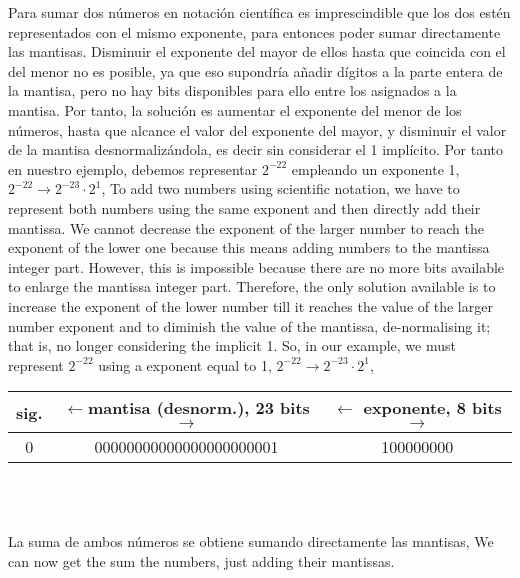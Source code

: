 \begin{paracol}{2}
Para sumar dos números en notación cientí\-fica es imprescindible que los dos estén representados con el mismo exponente, para entonces poder sumar directamente las mantisas. Disminuir el exponente del mayor de ellos hasta que coincida con el del menor no es posible, ya que eso supondría añadir dígitos a la parte entera de la mantisa, pero no hay bits disponibles para ello entre los asignados a la mantisa. Por tanto, la solución es aumentar el exponente del menor de los números, hasta que alcance el valor del exponente del mayor, y disminuir el valor de la mantisa desnormalizándola, es decir sin considerar el 1 implícito. 
Por tanto en nuestro ejemplo, debemos representar $2^{-22}$ empleando un exponente 1, $2^{-22}\rightarrow 2^{-23}\cdot 2^1$,
\switchcolumn
To add two numbers using scientific notation, we have to represent both numbers using the same exponent and then directly add their mantissa. We cannot decrease the exponent of the larger number to reach the exponent of the lower one because this means adding numbers to the mantissa integer part. However, this is impossible because there are no more bits available to enlarge the mantissa integer part. Therefore, the only solution available is to increase the exponent of the lower number till it reaches the value of the larger number exponent and to diminish the value of the mantissa, de-normalising it; that is, no longer considering the implicit 1. So, in our example, we must represent  $2^{-22}$ using a exponent equal to 1, $2^{-22}\rightarrow 2^{-23}\cdot 2^1$,
\end{paracol}

\begin{minipage}{\textwidth}
	\centering	
\begin{tabular}{|c||c||c|}
\hline
sig.&$\leftarrow$mantisa \textbf{(desnorm.)}, 23 bits $\rightarrow$&$\leftarrow$ exponente, 8 bits $\rightarrow$\\
\hline
0&00000000000000000000001&100000000\\
\hline
\end{tabular}\\
\ \\
\end{minipage}

\begin{paracol}{2}
La suma de ambos números se obtiene sumando directamente las mantisas,
\switchcolumn
We can now get the sum the numbers, just adding their mantissas. 
\end{paracol}

